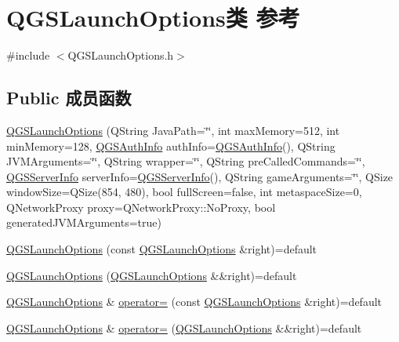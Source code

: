 \hypertarget{class_q_g_s_launch_options}{}\section{Q\+G\+S\+Launch\+Options类 参考}
\label{class_q_g_s_launch_options}


{\ttfamily \#include $<$Q\+G\+S\+Launch\+Options.\+h$>$}

\subsection*{Public 成员函数}
\begin{DoxyCompactItemize}
\item 
\mbox{\hyperlink{class_q_g_s_launch_options_a9c30f1914ab9eecfab92234b134c4191}{Q\+G\+S\+Launch\+Options}} (Q\+String Java\+Path=\char`\"{}\char`\"{}, int max\+Memory=512, int min\+Memory=128, \mbox{\hyperlink{class_q_g_s_auth_info}{Q\+G\+S\+Auth\+Info}} auth\+Info=\mbox{\hyperlink{class_q_g_s_auth_info}{Q\+G\+S\+Auth\+Info}}(), Q\+String J\+V\+M\+Arguments=\char`\"{}\char`\"{}, Q\+String wrapper=\char`\"{}\char`\"{}, Q\+String pre\+Called\+Commands=\char`\"{}\char`\"{}, \mbox{\hyperlink{class_q_g_s_server_info}{Q\+G\+S\+Server\+Info}} server\+Info=\mbox{\hyperlink{class_q_g_s_server_info}{Q\+G\+S\+Server\+Info}}(), Q\+String game\+Arguments=\char`\"{}\char`\"{}, Q\+Size window\+Size=Q\+Size(854, 480), bool full\+Screen=false, int metaspace\+Size=0, Q\+Network\+Proxy proxy=Q\+Network\+Proxy\+::\+No\+Proxy, bool generated\+J\+V\+M\+Arguments=true)
\item 
\mbox{\hyperlink{class_q_g_s_launch_options_ae576c820f78cfead80455fc1a8921514}{Q\+G\+S\+Launch\+Options}} (const \mbox{\hyperlink{class_q_g_s_launch_options}{Q\+G\+S\+Launch\+Options}} \&right)=default
\item 
\mbox{\hyperlink{class_q_g_s_launch_options_aa02cb62c82d12907a31d8bb4ea8f65f6}{Q\+G\+S\+Launch\+Options}} (\mbox{\hyperlink{class_q_g_s_launch_options}{Q\+G\+S\+Launch\+Options}} \&\&right)=default
\item 
\mbox{\hyperlink{class_q_g_s_launch_options}{Q\+G\+S\+Launch\+Options}} \& \mbox{\hyperlink{class_q_g_s_launch_options_a198b8420c33c8d56fb650d6a2e6d924c}{operator=}} (const \mbox{\hyperlink{class_q_g_s_launch_options}{Q\+G\+S\+Launch\+Options}} \&right)=default
\item 
\mbox{\hyperlink{class_q_g_s_launch_options}{Q\+G\+S\+Launch\+Options}} \& \mbox{\hyperlink{class_q_g_s_launch_options_afa748cac522ab7f2a3921f5392bd8ee0}{operator=}} (\mbox{\hyperlink{class_q_g_s_launch_options}{Q\+G\+S\+Launch\+Options}} \&\&right)=default

\end{DoxyCompactItemize}
